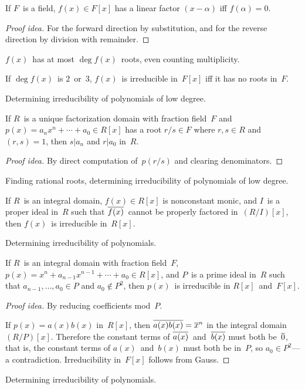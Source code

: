 \begin{thm}
If \(F\)~is a field, \(f(x)\in F[x]\) has a linear factor \((x-\alpha)\) iff \(f(\alpha)=0\).
\end{thm}
\begin{proof}[Proof idea]
For the forward direction by substitution, and for the reverse direction by division with remainder.
\end{proof}
\begin{cor}
\(f(x)\)~has at most \(\deg f(x)\)~roots, even counting multiplicity.
\end{cor}
\begin{cor}
If \(\deg f(x)\)~is \(2\)~or~\(3\), \(f(x)\)~is irreducible in~\(F[x]\) iff it has no roots in~\(F\).
\end{cor}
\begin{app}
Determining irreducibility of polynomials of low degree.
\end{app}

\begin{thm}
If \(R\)~is a unique factorization domain with fraction field~\(F\) and \(p(x)=a_nx^n+\cdots+a_0\in R[x]\) has a root \(r/s\in F\) where \(r,s\in R\) and \((r,s)=1\), then \(s|a_n\) and \(r|a_0\) in~\(R\).
\end{thm}
\begin{proof}[Proof idea]
By direct computation of~\(p(r/s)\) and clearing denominators.
\end{proof}
\begin{app}
Finding rational roots, determining irreducibility of polynomials of low degree.
\end{app}

\begin{thm}
If \(R\)~is an integral domain, \(f(x)\in R[x]\) is nonconstant monic, and \(I\)~is a proper ideal in~\(R\) such that \(\overline{f(x)}\)~cannot be properly factored in~\((R/I)[x]\), then \(f(x)\)~is irreducible in~\(R[x]\).
\end{thm}
\begin{app}
Determining irreducibility of polynomials.
\end{app}

\begin{cor}[Eisenstein]
If \(R\)~is an integral domain with fraction field~\(F\), \(p(x)=x^n+a_{n-1}x^{n-1}+\cdots+a_0\in R[x]\), and \(P\)~is a prime ideal in~\(R\) such that \(a_{n-1},\ldots,a_0\in P\) and \(a_0\not\in P^2\), then \(p(x)\)~is irreducible in \(R[x]\)~and~\(F[x]\).
\end{cor}
\begin{proof}[Proof idea]
By reducing coefficients mod~\(P\).

If \(p(x)=a(x)b(x)\) in~\(R[x]\), then \(\overline{a(x)b(x)}=\overline{x}^n\) in the integral domain~\((R/P)[x]\). Therefore the constant terms of \(\overline{a(x)}\)~and~\(\overline{b(x)}\) must both be~\(\overline{0}\), that is, the constant terms of \(a(x)\)~and~\(b(x)\) must both be in~\(P\), so \(a_0\in P^2\)---a contradiction. Irreducibility in~\(F[x]\) follows from Gauss.
\end{proof}
\begin{app}
Determining irreducibility of polynomials.
\end{app}


